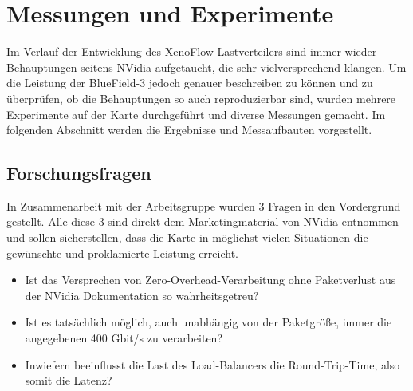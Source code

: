 \chapter{Messungen und Experimente}
\label{cha:experiments}
Im Verlauf der Entwicklung des XenoFlow Lastverteilers sind immer wieder Behauptungen seitens NVidia aufgetaucht, die sehr vielversprechend klangen. Um die Leistung der BlueField-3 jedoch genauer beschreiben zu können und zu überprüfen, ob die Behauptungen so auch reproduzierbar sind, wurden mehrere Experimente auf der Karte durchgeführt und diverse Messungen gemacht. Im folgenden Abschnitt werden die Ergebnisse und Messaufbauten vorgestellt.
\section{Forschungsfragen}
In Zusammenarbeit mit der Arbeitsgruppe wurden 3 Fragen in den Vordergrund gestellt. Alle diese 3 sind direkt dem Marketingmaterial von NVidia entnommen und sollen sicherstellen, dass die Karte in möglichst vielen Situationen die gewünschte und proklamierte Leistung erreicht.
\begin{itemize}
    \item Ist das Versprechen von Zero-Overhead-Verarbeitung ohne Paketverlust aus der NVidia Dokumentation so wahrheitsgetreu?
    \item Ist es tatsächlich möglich, auch unabhängig von der Paketgröße, immer die angegebenen 400 Gbit/s zu verarbeiten?
    \item Inwiefern beeinflusst die Last des Load-Balancers die Round-Trip-Time, also somit die Latenz?
\end{itemize}
